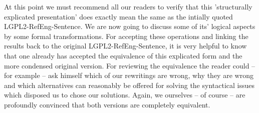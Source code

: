 At this point we must recommend all our readers to verify that this
'structurally explicated presentation' does exactly mean the same as the
intially quoted LGPL2-RefEng-Sentence. We are now going to discuss some of its'
logical aspects by some formal transformations. For accepting these operations
and linking the results back to the original LGPL2-RefEng-Sentence, it is very
helpful to know that one already has accepted the equivalence of this explicated
form and the more condensed original version. For reviewing the equivalence the
reader could -- for example -- ask himself which of our rewritings are wrong,
why they are wrong and which alternatives can reasonably be offered for solving
the syntactical issues which disposed us to chose our solutions. Again, we
ourselves -- of course -- are profoundly convinced that both versions are
completely equivalent.


